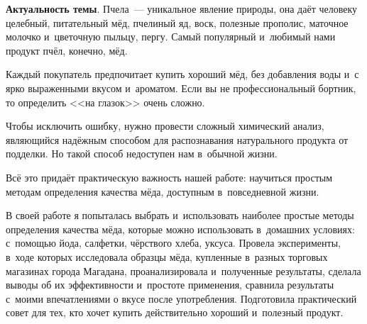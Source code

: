 \textbf{Актуальность темы}. Пчела~--- уникальное явление природы, она даёт человеку целебный, питательный мёд, пчелиный яд, воск, полезные прополис, маточное молочко и~цветочную пыльцу, пергу. Самый популярный и~любимый нами продукт пчёл, конечно, мёд.

Каждый покупатель предпочитает купить хороший мёд, без добавления воды и~с ярко выраженными вкусом и~ароматом. Если вы не профессиональный бортник, то определить <<на глазок>> очень сложно.

Чтобы исключить ошибку, нужно провести сложный химический анализ, являющийся надёжным способом для распознавания натурального продукта от подделки. Но такой способ недоступен нам в~обычной жизни.

Всё это придаёт практическую важность нашей работе: научиться простым методам определения качества мёда, доступным в~повседневной жизни.

В своей работе я попыталась выбрать и~использовать наиболее простые методы определения качества мёда, которые можно использовать в~домашних условиях: с~помощью йода, салфетки, чёрствого хлеба, уксуса. Провела эксперименты, в~ходе которых исследовала образцы мёда, купленные в~разных торговых магазинах города Магадана, проанализировала и~полученные результаты, сделала выводы об их эффективности и~простоте применения, сравнила результаты с~моими впечатлениями о вкусе после употребления. Подготовила практический совет для тех, кто хочет купить действительно хороший и~полезный продукт.
